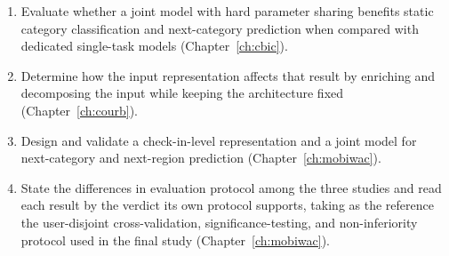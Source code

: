 \begin{enumerate}
    \item Evaluate whether a joint model with hard parameter sharing benefits static
    category classification and next-category prediction when compared with
    dedicated single-task models (Chapter~\ref{ch:cbic}).
    \item Determine how the input representation affects that result by enriching and
    decomposing the input while keeping the architecture fixed
    (Chapter~\ref{ch:courb}).
    \item Design and validate a check-in-level representation and a joint model for
    next-category and next-region prediction (Chapter~\ref{ch:mobiwac}).
    \item State the differences in evaluation protocol among the three studies and read
    each result by the verdict its own protocol supports, taking as the reference the
    user-disjoint cross-validation, significance-testing, and non-inferiority protocol
    used in the final study (Chapter~\ref{ch:mobiwac}).
\end{enumerate}

